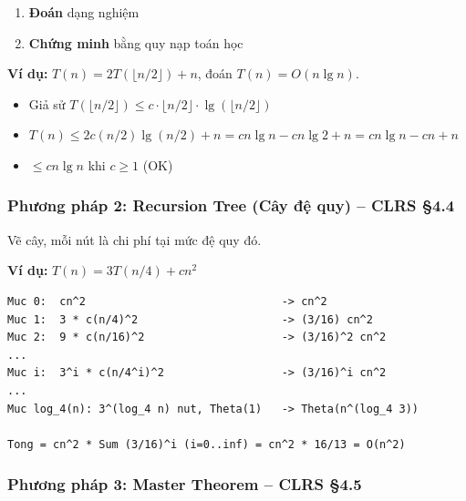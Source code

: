 \documentclass[10pt]{article}
\providecommand{\tightlist}{\setlength{\itemsep}{0pt}\setlength{\parskip}{0pt}}
\begin{document}
\begin{enumerate}
\def\labelenumi{\arabic{enumi}.}
\tightlist
\item
  \textbf{Đoán} dạng nghiệm
\item
  \textbf{Chứng minh} bằng quy nạp toán học
\end{enumerate}

\textbf{Ví dụ:} \(T(n) = 2T(\lfloor n/2 \rfloor) + n\), đoán
\(T(n) = O(n \lg n)\).

\begin{itemize}
\tightlist
\item
  Giả sử
  \(T(\lfloor n/2 \rfloor) \leq c \cdot \lfloor n/2 \rfloor \cdot \lg(\lfloor n/2 \rfloor)\)
\item
  \(T(n) \leq 2 c (n/2) \lg(n/2) + n = cn \lg n - cn \lg 2 + n = cn \lg n - cn + n\)
\item
  \(\leq cn \lg n\) khi \(c \geq 1\) (OK)
\end{itemize}

\subsubsection{\texorpdfstring{Phương pháp 2: Recursion Tree (Cây đệ
quy) -- CLRS
\S 4.4}{Phương pháp 2: Recursion Tree (Cây đệ quy) -- CLRS 4.4}}\label{phux1b0ux1a1ng-phuxe1p-2-recursion-tree-cuxe2y-ux111ux1ec7-quy-clrs-4.4}

Vẽ cây, mỗi nút là chi phí tại mức đệ quy đó.

\textbf{Ví dụ:} \(T(n) = 3T(n/4) + cn^2\)

\begin{tcolorbox}[colback=gray!8, colframe=gray!50, boxrule=0.5pt, arc=2pt,
  left=6pt, right=6pt, top=4pt, bottom=4pt,
  title={\small\textbf{Pseudocode 9: Cây đệ quy (Recursion Tree)}}]
\begin{verbatim}
Muc 0:  cn^2                              -> cn^2
Muc 1:  3 * c(n/4)^2                      -> (3/16) cn^2
Muc 2:  9 * c(n/16)^2                     -> (3/16)^2 cn^2
...
Muc i:  3^i * c(n/4^i)^2                  -> (3/16)^i cn^2
...
Muc log_4(n): 3^(log_4 n) nut, Theta(1)   -> Theta(n^(log_4 3))

Tong = cn^2 * Sum (3/16)^i (i=0..inf) = cn^2 * 16/13 = O(n^2)
\end{verbatim}
\end{tcolorbox}

\subsubsection{\texorpdfstring{Phương pháp 3: Master Theorem -- CLRS
\S 4.5}{Phương pháp 3: Master Theorem -- CLRS 4.5}}\label{phux1b0ux1a1ng-phuxe1p-3-master-theorem-clrs-4.5}
\end{document}
